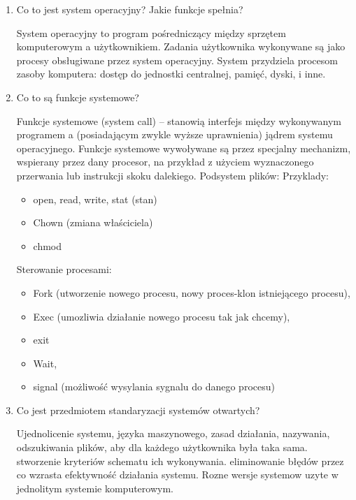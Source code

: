 \documentclass[11pt]{article}
\begin{document}
\begin{enumerate}
    \item Co to jest system operacyjny? Jakie funkcje spełnia?

          System operacyjny to program pośredniczący między sprzętem
          komputerowym a użytkownikiem. Zadania użytkownika
          wykonywane są jako procesy obsługiwane przez system
          operacyjny. System przydziela procesom zasoby komputera:
          dostęp do jednostki centralnej, pamięć, dyski, i inne.

    \item Co to są funkcje systemowe?


          Funkcje systemowe (system call) – stanowią interfejs między
          wykonywanym programem a (posiadającym zwykle wyższe
          uprawnienia) jądrem systemu operacyjnego. Funkcje systemowe
          wywoływane są przez specjalny mechanizm, wspierany przez dany
          procesor, na przykład z użyciem wyznaczonego przerwania lub
          instrukcji skoku dalekiego.
          Podsystem plików:
          Przyklady:
          \begin{itemize}
              \item open, read, write, stat (stan)
              \item Chown (zmiana właściciela)
              \item chmod
          \end{itemize}

          Sterowanie procesami:
          \begin{itemize}
              \item Fork (utworzenie nowego procesu, nowy proces-klon istniejącego procesu),
              \item Exec (umozliwia działanie nowego procesu tak jak chcemy),
              \item exit
              \item Wait,
              \item signal (możliwość wysylania sygnalu do danego procesu)
          \end{itemize}
    \item Co jest przedmiotem standaryzacji systemów otwartych?

          Ujednolicenie systemu, języka maszynowego, zasad działania,
          nazywania, odszukiwania plików, aby dla każdego użytkownika
          była taka sama.
          stworzenie kryteriów schematu ich wykonywania.
          eliminowanie błędów przez co wzrasta efektywność działania
          systemu.
          Rozne wersje systemow uzyte w jednolitym systemie
          komputerowym.
\end{enumerate}
\end{document}
